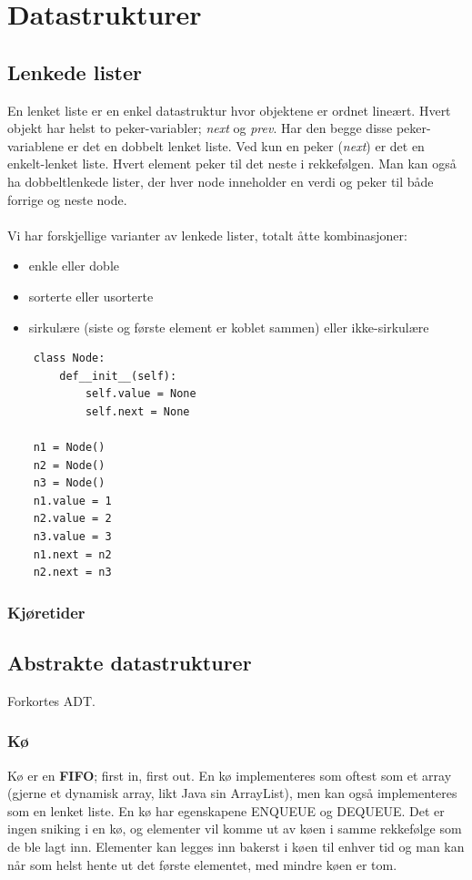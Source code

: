 \section{Datastrukturer}

\subsection{Lenkede lister}
En lenket liste er en enkel datastruktur hvor objektene er ordnet lineært. Hvert objekt har helst to peker-variabler; \textit{next} og \textit{prev}. Har den begge disse peker-variablene er det en dobbelt lenket liste. Ved kun en peker (\textit{next}) er det en enkelt-lenket liste. Hvert element peker til det neste i rekkefølgen. Man kan også ha dobbeltlenkede lister, der hver node inneholder en verdi og peker til både forrige og neste node.
\\\\
Vi har forskjellige varianter av lenkede lister, totalt åtte kombinasjoner:
\begin{itemize}
    \item enkle eller doble
    \item sorterte eller usorterte
    \item sirkulære (siste og første element er koblet sammen) eller ikke-sirkulære
\end{itemize}

\begin{lstlisting}
    class Node:
    	def__init__(self):
    		self.value = None
    		self.next = None
    
    n1 = Node()
    n2 = Node()
    n3 = Node()
    n1.value = 1
    n2.value = 2
    n3.value = 3
    n1.next = n2
    n2.next = n3
\end{lstlisting}

\subsubsection{Kjøretider}


\subsection{Abstrakte datastrukturer}
Forkortes ADT.

\subsubsection{Kø}
Kø er en \textbf{FIFO}; first in, first out. En kø implementeres som oftest som et array (gjerne et dynamisk array, likt Java sin ArrayList), men kan også implementeres som en lenket liste. En kø har egenskapene ENQUEUE og DEQUEUE. Det er ingen sniking i en kø, og elementer vil komme ut av køen i samme rekkefølge som de ble lagt inn. Elementer kan legges inn bakerst i køen til enhver tid og man kan når som helst hente ut det første elementet, med mindre køen er tom.

